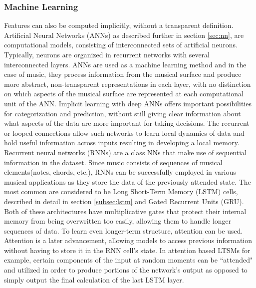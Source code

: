         \subsubsection{Machine Learning}
        Features can also be computed implicitly, without a transparent definition. Artificial Neural Networks (ANNs) as described further in section \ref{sec:nn}, are computational models, consisting of interconnected sets of artificial neurons. Typically, neurons are organized in recurrent networks with several interconnected layers. ANNs are used as a machine learning method and in the case of music, they process information from the musical surface and produce more abstract, non-transparent representations in each layer, with no distinction on which aspects of the musical surface are represented at each computational unit of the ANN. Implicit learning with deep ANNs offers important possibilities for categorization and prediction, without still giving clear information about what aspects of the data are more important for taking decisions. The recurrent or looped connections allow such networks to learn local dynamics of data and hold useful information across inputs resulting in developing a local memory. Recurrent neural networks (RNNs) are a class NNs that make use of sequential information in the dataset.
        Since music consists of sequences of musical elements(notes, chords, etc.), RNNs can be successfully employed in various musical applications as they store the data of the previously attended state. The most common are considered to be Long Short-Term Memory (LSTM) cells, described in detail in section \ref{subsec:lstm} and Gated Recurrent Units (GRU). Both of these architectures have multiplicative gates that protect their internal memory from being overwritten too easily, allowing them to handle longer sequences of data. To learn even longer-term structure, attention can be used. Attention is a later advancement, allowing models to access previous information without having to store it in the RNN cell’s state. In attention based LTSMs for example, certain components of the input at random moments can be ``attended" and utilized in order to produce portions of the network's output as opposed to simply output the final calculation of the last LSTM layer.
        


